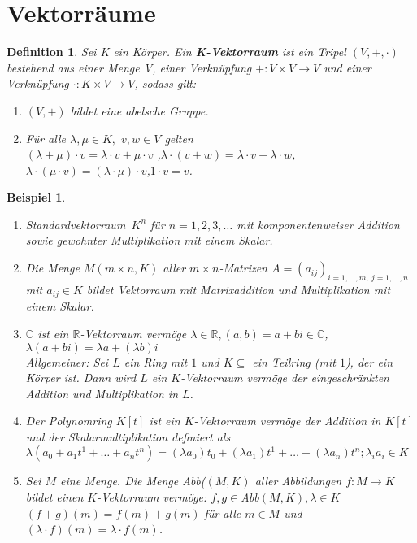\documentclass[12pt,a4paper]{article}
\theoremstyle{plain}
\newtheorem{Definition}[Theorem]{Definition}
\newtheorem{Beispiel}[Theorem]{Beispiel}
\newcommand{\herv}[1]{{\emph{\textbf{#1}}}}
\newcommand{\R}{\mathbb{R}}
\newcommand{\C}{\mathbb{C}}
\numberwithin{equation}{section}
\begin{document}
\section{Vektorräume}
\begin{Definition}
Sei K ein Körper. Ein \herv{K-Vektorraum} ist ein Tripel $(V,+,\cdot)$ bestehend aus einer Menge V, einer Verknüpfung $+:V\times V \rightarrow V$ und einer Verknüpfung $\cdot : K\times V \rightarrow V$, sodass gilt:
\begin{enumerate}
\renewcommand{\labelenumi}{\emph{(V\arabic{enumi})}}
\item $(V,+)$ bildet eine abelsche Gruppe.
\item Für alle $\lambda, \mu \in K,$  $ v,w\in V$ gelten \\
$(\lambda+\mu)\cdot v=\lambda \cdot v+ \mu\cdot v$ ,\quad $\lambda\cdot (v+w)=\lambda\cdot v+ \lambda \cdot w$,\quad $\lambda\cdot (\mu\cdot v)=(\lambda\cdot\mu)\cdot v$,\quad $1\cdot v=v$.
\end{enumerate}
\end{Definition}
\begin{Beispiel}
\begin{enumerate}
\renewcommand{\labelenumi}{\alph{enumi})}
\item \glqq Standardvektorraum\grqq\ $K^n$ für $n=1,2,3,\ldots$ mit komponentenweiser Addition sowie gewohnter Multiplikation mit einem Skalar.
\item Die Menge $M(m\times n,K)$ aller $m\times n$-Matrizen $A=(a_{ij})_{i=1,\ldots,m,\ j=1,\ldots,n}$ mit $a_{ij}\in K$ bildet Vektorraum mit Matrixaddition und Multiplikation mit einem Skalar.
\item $\C$ ist ein $\R$-Vektorraum vermöge $\lambda\in\R, (a,b)=a+bi\in\C$, $\lambda(a+bi)=\lambda a+(\lambda b) i$\\
Allgemeiner: Sei $L$ ein Ring mit $1$ und $K\subseteq$ ein Teilring (mit $1$), der ein Körper ist. Dann wird $L$ ein $K$-Vektorraum vermöge der eingeschränkten Addition und Multiplikation in $L$.
\item Der Polynomring $K[t]$ ist ein $K$-Vektorraum vermöge der Addition in $K[t]$ und der Skalarmultiplikation definiert als $\lambda(a_0+a_1t^1+\ldots+a_nt^n)=(\lambda a_0)t_0+(\lambda a_1)t^1+\ldots+(\lambda a_n)t^n; \lambda_ia_i \in K$
\item  Sei $M$ eine Menge. Die Menge Abb($(M,K)$ aller Abbildungen $f:M\rightarrow K$ bildet einen $K$-Vektorraum vermöge: $f,g\in$Abb$(M,K),\lambda\in K$ $(f+g)(m)=f(m)+g(m)$ für alle $m\in M$ und $(\lambda\cdot f)(m)=\lambda\cdot f(m)$.
\end{enumerate}
\end{Beispiel}
\end{document}
